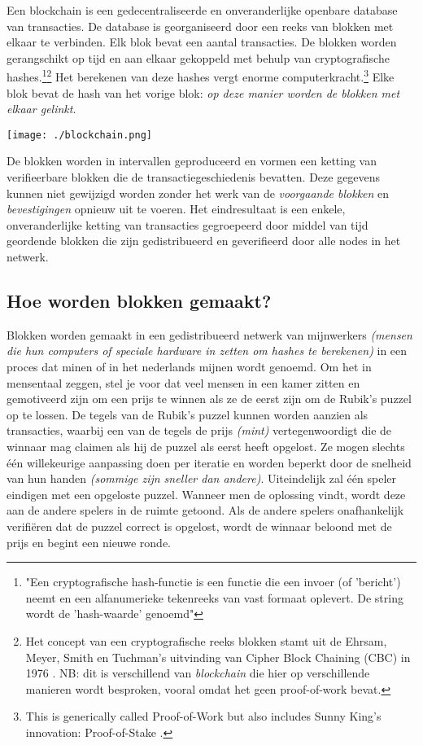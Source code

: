 \documentclass[11pt]{article}
\begin{document}
Een blockchain is een gedecentraliseerde en onveranderlijke openbare database van transacties. De database is georganiseerd door een reeks van blokken met elkaar te verbinden. Elk blok bevat een aantal transacties.
De blokken worden gerangschikt op tijd en aan elkaar gekoppeld met behulp van cryptografische hashes.\footnote{"Een cryptografische hash-functie is een functie die een invoer (of 'bericht') neemt en een alfanumerieke tekenreeks van vast formaat oplevert. De string wordt de 'hash-waarde' genoemd"\cite{wikihash}}\footnote{Het concept van een cryptografische reeks blokken stamt uit de Ehrsam, Meyer, Smith en Tuchman's uitvinding van Cipher Block Chaining (CBC) in 1976 \cite{cbc}. NB: dit is verschillend van \textit{blockchain} die hier op verschillende manieren wordt besproken, vooral omdat het geen proof-of-work bevat.}
Het berekenen van deze hashes vergt enorme computerkracht.\footnote{This is generically called Proof-of-Work but also includes Sunny King's innovation: Proof-of-Stake \cite{peercoin}.} Elke blok bevat de hash van het vorige blok: \textit{op deze manier worden de blokken met elkaar gelinkt}.

\begin{center}
\texttt{[image: ./blockchain.png]}
\end{center}
De blokken worden in intervallen geproduceerd en vormen een ketting van verifieerbare blokken die de transactiegeschiedenis bevatten. Deze gegevens kunnen niet gewijzigd worden zonder het werk van de \textit{voorgaande blokken} en \textit{bevestigingen} opnieuw uit te voeren.
Het eindresultaat is een enkele, onveranderlijke ketting van transacties gegroepeerd door middel van tijd geordende blokken die zijn gedistribueerd en geverifieerd door alle nodes in het netwerk.

\subsection{Hoe worden blokken gemaakt?}

Blokken worden gemaakt in een gedistribueerd netwerk van mijnwerkers \textit{(mensen die hun computers of speciale hardware in zetten om hashes te berekenen)} in een proces dat minen of in het nederlands mijnen wordt genoemd.
Om het in mensentaal zeggen, stel je voor dat veel mensen in een kamer zitten en gemotiveerd zijn om een ​​prijs te winnen als ze de eerst zijn om de Rubik's puzzel op te lossen. De tegels van de Rubik's puzzel kunnen worden aanzien als transacties, waarbij een van de tegels de prijs \textit{(mint)} vertegenwoordigt die de winnaar mag claimen als hij de puzzel als eerst heeft opgelost. 
Ze mogen slechts één willekeurige aanpassing doen per iteratie en worden beperkt door de snelheid van hun handen \textit{(sommige zijn sneller dan andere)}.
Uiteindelijk zal één speler eindigen met een opgeloste puzzel. Wanneer men de oplossing vindt, wordt deze aan de andere spelers in de ruimte getoond. Als de andere spelers onafhankelijk verifiëren dat de puzzel correct is opgelost, wordt de winnaar beloond met de prijs en begint een nieuwe ronde.
\end{document}
